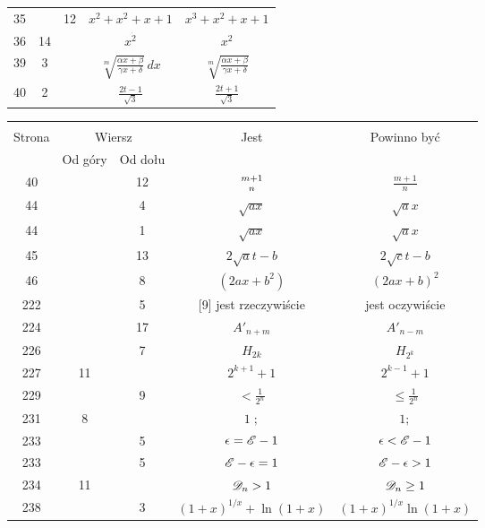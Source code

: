 \documentclass[a4paper,11pt]{article}
\begin{document}
\begin{center}
\begin{tabular}{|c|c|c|c|c|}
    35  & & 12 & $x^{ 2 } + x^{ 2 } + x + 1$
           & $x^{ 3 } + x^{ 2 } + x + 1$ \\
    36  & 14 & & $x^{ \dot{ 2 } }$ & $x^{ 2 }$ \\[0.2em]
    39  &  3 & & $\sqrt[ m ]{ \frac{ \alpha x + \beta }{ \gamma x + \delta } } \, dx$
           & $\sqrt[ m ]{ \frac{ \alpha x + \beta }{ \gamma x + \delta } }$ \\[0.2em]
    40  &  2 & & $\frac{ 2t - 1 }{ \sqrt{ 3 } }$
           & $\frac{ 2t + 1 }{ \sqrt{ 3 } }$ \\
    \hline
  \end{tabular}





  \begin{tabular}{|c|c|c|c|c|}
    \hline
    & \multicolumn{2}{c|}{} & & \\
    Strona & \multicolumn{2}{c|}{Wiersz} & Jest
                              & Powinno być \\ \cline{2-3}
    & Od góry & Od dołu & & \\
    \hline
    40  & & 12 & ${ m + 1 \atop n }$ & $\frac{ m + 1 }{ n }$ \\
    44  & &  4 & $\sqrt{ a x }$ & $\sqrt{ a } x$ \\
    44  & &  1 & $\sqrt{ a x }$ & $\sqrt{ a } x$ \\
    45  & & 13 & $2 \sqrt{ a } t - b$ & $2 \sqrt{ c } t - b$ \\
    46  & &  8 & $( 2 a x + b^{ 2 } )$ & $( 2 a x + b )^{ 2 }$ \\
    222 & &  5 & [9] jest rzeczywiście & jest oczywiście \\
    224 & & 17 & $A'_{ n + m }$ & $A'_{ n - m }$ \\
    226 & &  7 & $H_{ 2k }$ & $H_{ 2^{ k } }$ \\
    227 & 11 & & $2^{ k + 1 } + 1$ & $2^{ k - 1 } + 1$ \\
    229 & &  9 & $< \frac{ 1 }{ 2^{ n } }$ & $\leq \frac{ 1 }{ 2^{ n } }$ \\
    231 &  8 & & $1\; ;$ & $1;$ \\
    233 & &  5 & $\epsilon = \mathcal{E} - 1$ & $\epsilon < \mathcal{E} - 1$ \\
    233 & &  5 & $\mathcal{E} - \epsilon = 1$ & $\mathcal{E} - \epsilon > 1$ \\
    234 & 11 & & $\mathcal{D}_{ n } > 1$ & $\mathcal{D}_{ n } \geq 1$ \\
    238 & &  3 & $( 1 + x )^{ 1 / x } + \ln( 1 + x )$
           & $( 1 + x )^{ 1 / x } \ln( 1 + x )$ \\

\end{tabular}
\end{center}
\end{document}
